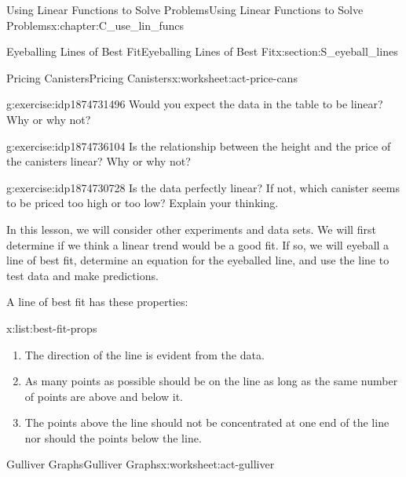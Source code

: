 \documentclass[oneside,10pt,]{book}
\numberwithin{equation}{chapter}
\begin{document}
\begin{chapterptx}{Using Linear Functions to Solve Problems}{}{Using Linear Functions to Solve Problems}{}{}{x:chapter:C_use_lin_funcs}
\begin{sectionptx}{Eyeballing Lines of Best Fit}{}{Eyeballing Lines of Best Fit}{}{}{x:section:S_eyeball_lines}
\begin{worksheet-subsection}{Pricing Canisters}{}{Pricing Canisters}{}{}{x:worksheet:act-price-cans}
\begin{sidebyside}{2}{0}{0}{0}
\begin{sbspanel}{0.5}
\end{sbspanel}%
\end{sidebyside}%
\begin{divisionexercise}{1}{}{}{g:exercise:idp1874731496}%
Would you expect the data in the table to be linear? Why or why not?%
\end{divisionexercise}%
\begin{divisionexercise}{2}{}{}{g:exercise:idp1874736104}%
Is the relationship between the height and the price of the canisters linear? Why or why not?%
\end{divisionexercise}%
\begin{divisionexercise}{3}{}{}{g:exercise:idp1874730728}%
Is the data perfectly linear? If not, which canister seems to be priced too high or too low? Explain your thinking.%
\end{divisionexercise}%
\begin{conclusion}{}%
In this lesson, we will consider other experiments and data sets. We will first determine if we think a linear trend would be a good fit. If so, we will eyeball a line of best fit, determine an equation for the eyeballed line, and use the line to test data and make predictions.%
\par
A line of best fit has these properties: \begin{listptx}{\textbf{}}{x:list:best-fit-props}{}%
%
\begin{enumerate}[label=(\alph*)]
\item{}The direction of the line is evident from the data.%
\item{}As many points as possible should be on the line as long as the same number of points are above and below it.%
\item{}The points above the line should not be concentrated at one end of the line nor should the points below the line.%
\end{enumerate}
\end{listptx}%
%
\end{conclusion}%
\end{worksheet-subsection}
\restoregeometry
%
%
\typeout{************************************************}
\typeout{************************************************}
%
\begin{worksheet-subsection}{Gulliver Graphs}{}{Gulliver Graphs}{}{}{x:worksheet:act-gulliver}
\begin{introduction}{}%

\end{introduction}
\end{worksheet-subsection}
\end{sectionptx}
\end{chapterptx}
\end{document}
